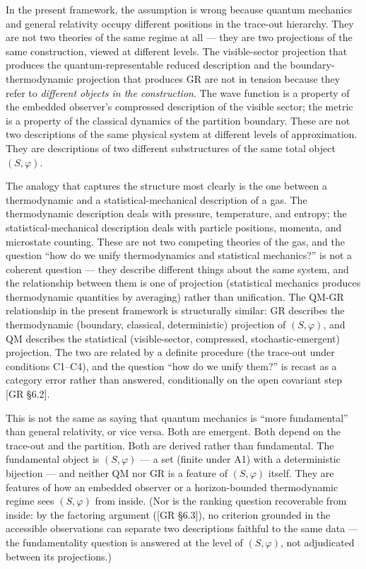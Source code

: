 \documentclass[
]{article}
\begin{document}
In the present framework, the assumption is wrong because quantum
mechanics and general relativity occupy different positions in the
trace-out hierarchy. They are not two theories of the same regime at all
--- they are two projections of the same construction, viewed at
different levels. The visible-sector projection that produces the
quantum-representable reduced description and the boundary-thermodynamic
projection that produces GR are not in tension because they refer to
\emph{different objects in the construction}. The wave function is a
property of the embedded observer's compressed description of the
visible sector; the metric is a property of the classical dynamics of
the partition boundary. These are not two descriptions of the same
physical system at different levels of approximation. They are
descriptions of two different substructures of the same total object
\((S, \varphi)\).

The analogy that captures the structure most clearly is the one between
a thermodynamic and a statistical-mechanical description of a gas. The
thermodynamic description deals with pressure, temperature, and entropy;
the statistical-mechanical description deals with particle positions,
momenta, and microstate counting. These are not two competing theories
of the gas, and the question ``how do we unify thermodynamics and
statistical mechanics?'' is not a coherent question --- they describe
different things about the same system, and the relationship between
them is one of projection (statistical mechanics produces thermodynamic
quantities by averaging) rather than unification. The QM-GR relationship
in the present framework is structurally similar: GR describes the
thermodynamic (boundary, classical, deterministic) projection of
\((S, \varphi)\), and QM describes the statistical (visible-sector,
compressed, stochastic-emergent) projection. The two are related by a
definite procedure (the trace-out under conditions C1--C4), and the
question ``how do we unify them?'' is recast as a category error rather
than answered, conditionally on the open covariant step {[}GR §6.2{]}.

This is not the same as saying that quantum mechanics is ``more
fundamental'' than general relativity, or vice versa. Both are emergent.
Both depend on the trace-out and the partition. Both are derived rather
than fundamental. The fundamental object is \((S, \varphi)\) --- a set
(finite under A1) with a deterministic bijection --- and neither QM nor
GR is a feature of \((S, \varphi)\) itself. They are features of how an
embedded observer or a horizon-bounded thermodynamic regime sees
\((S, \varphi)\) from inside. (Nor is the ranking question recoverable
from inside: by the factoring argument ({[}GR §6.3{]}), no criterion
grounded in the accessible observations can separate two descriptions
faithful to the same data --- the fundamentality question is answered at
the level of \((S, \varphi)\), not adjudicated between its projections.)
\end{document}
